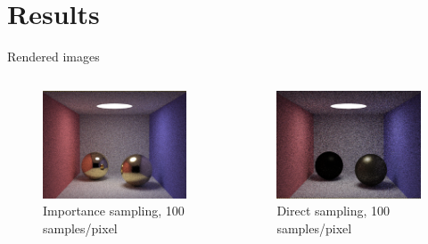 \documentclass[10pt]{beamer}
\begin{document}
\section{Results}
\begin{frame}{Rendered images}
  \begin{columns}
    \begin{figure}[H]
      \centering
      \includegraphics[width=.9\linewidth]{IS100.png}
      \caption{Importance sampling, 100 samples/pixel}
      \label{fig:sub1}
    \end{figure}

    \begin{figure}[H]
      \centering
      \includegraphics[width=.9\linewidth]{DS100.png}
      \caption{Direct sampling, 100 samples/pixel}
      \label{fig:sub2}
    \end{figure}
  \end{columns}
\end{frame}
\end{document}

